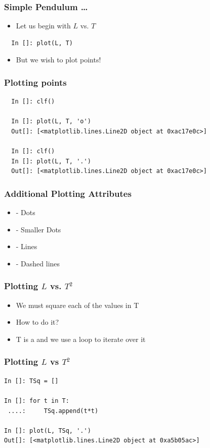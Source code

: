 \documentclass[14pt,compress]{beamer}
\newcommand{\kwrd}[1]{ \texttt{\textbf{\color{blue}{#1}}}  }
\begin{document}
\begin{frame}[fragile]
\frametitle{Simple Pendulum \ldots}
\begin{itemize}
\item Let us begin with $L$ vs. \alert{$T$}
\end{itemize}
\begin{lstlisting}
  In []: plot(L, T)
\end{lstlisting}
\begin{itemize}
\item But we wish to plot points!
\end{itemize}
\end{frame}

\begin{frame}[fragile]
\frametitle{Plotting points}
\begin{lstlisting}
  In []: clf()

  In []: plot(L, T, 'o')
  Out[]: [<matplotlib.lines.Line2D object at 0xac17e0c>]

  In []: clf()
  In []: plot(L, T, '.')
  Out[]: [<matplotlib.lines.Line2D object at 0xac17e0c>]
\end{lstlisting}
\end{frame}

\begin{frame}[fragile]
\frametitle{Additional Plotting Attributes}
\begin{itemize}
  \item \kwrd{'o'} - Dots
  \item \kwrd{'.'} - Smaller Dots
  \item \kwrd{'-'} - Lines
  \item \kwrd{'- -'} - Dashed lines
\end{itemize}
\end{frame}

\begin{frame}[fragile]
\frametitle{Plotting $L$ vs. $T^2$}
\begin{itemize}
\item We must square each of the values in T
\item How to do it?
\item T is a \kwrd{list} and we use a \kwrd{for} loop to iterate over it
\end{itemize}
\end{frame}

\begin{frame}[fragile]
\frametitle{Plotting $L$ vs $T^2$}
\begin{lstlisting}
In []: TSq = []

In []: for t in T:
 ....:     TSq.append(t*t)

In []: plot(L, TSq, '.')
Out[]: [<matplotlib.lines.Line2D object at 0xa5b05ac>]
\end{lstlisting}
\end{frame}
\end{document}
